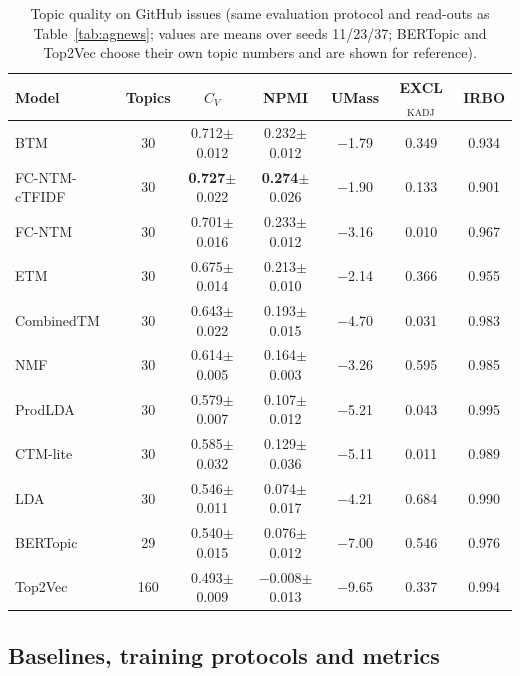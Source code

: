 \documentclass[pdflatex,sn-basic]{sn-jnl}
\newcommand{\fcntm}{FC-NTM}
\begin{document}
\begin{table}[t]
\centering
\caption{Topic quality on GitHub issues (same evaluation protocol and read-outs as Table~\ref{tab:agnews}; values are means over seeds 11/23/37; BERTopic and Top2Vec choose their own topic numbers and are shown for reference).}
\label{tab:github}
\small
\begin{tabular}{lcccccc}
\toprule
Model & Topics & $C_V$ & NPMI & UMass & EXCL$_{\mathrm{KADJ}}$ & IRBO \\
\midrule
BTM & 30 & 0.712$\pm$0.012 & 0.232$\pm$0.012 & $-$1.79 & 0.349 & 0.934 \\
\fcntm{}-cTFIDF & 30 & \textbf{0.727}$\pm$0.022 & \textbf{0.274}$\pm$0.026 & $-$1.90 & 0.133 & 0.901 \\
\fcntm{} & 30 & 0.701$\pm$0.016 & 0.233$\pm$0.012 & $-$3.16 & 0.010 & 0.967 \\
ETM & 30 & 0.675$\pm$0.014 & 0.213$\pm$0.010 & $-$2.14 & 0.366 & 0.955 \\
CombinedTM & 30 & 0.643$\pm$0.022 & 0.193$\pm$0.015 & $-$4.70 & 0.031 & 0.983 \\
NMF & 30 & 0.614$\pm$0.005 & 0.164$\pm$0.003 & $-$3.26 & 0.595 & 0.985 \\
ProdLDA & 30 & 0.579$\pm$0.007 & 0.107$\pm$0.012 & $-$5.21 & 0.043 & 0.995 \\
CTM-lite & 30 & 0.585$\pm$0.032 & 0.129$\pm$0.036 & $-$5.11 & 0.011 & 0.989 \\
LDA & 30 & 0.546$\pm$0.011 & 0.074$\pm$0.017 & $-$4.21 & 0.684 & 0.990 \\
BERTopic & 29 & 0.540$\pm$0.015 & 0.076$\pm$0.012 & $-$7.00 & 0.546 & 0.976 \\
Top2Vec & 160 & 0.493$\pm$0.009 & $-$0.008$\pm$0.013 & $-$9.65 & 0.337 & 0.994 \\
\bottomrule
\end{tabular}
\end{table}

\subsection{Baselines, training protocols and metrics}
\label{sec:protocol}
\end{document}
